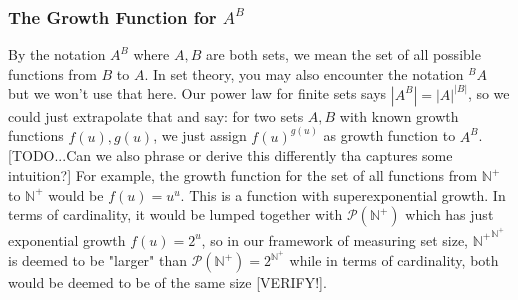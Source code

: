 \documentclass[12pt]{article}
\begin{document}
\subsubsection{The Growth Function for $A^B$}
By the notation $A^B$ where $A,B$ are both sets, we mean the set of all possible functions from $B$ to $A$. In set theory, you may also encounter the notation ${}^{B}A$ but we won't use that here. Our power law for finite sets says $|A^B| = |A|^{|B|}$, so we could just extrapolate that and say: for two sets $A,B$ with known growth functions $f(u), g(u)$, we just assign $f(u)^{g(u)}$ as growth function to $A^B$. [TODO...Can we also phrase or derive this differently tha captures some intuition?] For example, the growth function for the set of all functions from $\mathbb{N}^+$ to $\mathbb{N}^+$ would be $f(u) = u^u$. This is a function with superexponential growth. In terms of cardinality, it would be lumped together with $\mathcal{P}(\mathbb{N}^+)$ which has just exponential growth $f(u) = 2^u$, so in our framework of measuring set size, ${\mathbb{N}^+}^{\mathbb{N}^+}$ is deemed to be "larger" than $\mathcal{P}(\mathbb{N}^+) = 2^{\mathbb{N}^+}$ while in terms of cardinality, both would be deemed to be of the same size [VERIFY!].





%


\end{document}
